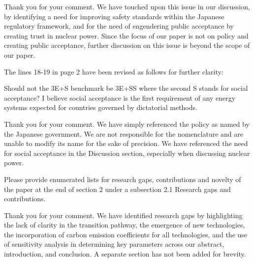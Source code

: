\documentclass[answers,11pt]{exam}
\begin{document}
\begin{questions}
        \begin{solution}
        
                 Thank you for your comment. We have touched upon this issue in our discussion, by identifying a need for improving safety standards within the Japanese regulatory framework, and for the need of engendering public acceptance by creating trust in nuclear power. Since the focus of our paper is not on policy and creating public acceptance, further discussion on this issue is beyond the scope of our paper.
                 
                 The lines 18-19 in page 2 have been revised as follows for further clarity:
                 
                 
        \end{solution}


  
                        \question  Should not the 3E+S benchmark be 3E+SS where the second S stands for social acceptance? I believe social acceptance is the first requirement of any energy systems expected for countries governed by dictatorial methods.
        
        \begin{solution}
        
                 Thank you for your comment. We have simply referenced the policy as named by the Japanese government. We are not responsible for the nomenclature and are unable to modify its name for the sake of precision. We have referenced the need for social acceptance in the Discussion section, especially when discussing nuclear power.
                 
                 
        \end{solution}      
        
        
                        \question   Please provide enumerated lists for research gaps, contributions and novelty of the paper at the end of section 2 under a subsection 2.1 Research gaps and contributions.
                                
        \begin{solution}
        
                 Thank you for your comment. We have identified research gaps by highlighting the lack of clarity in the transition pathway, the emergence of new technologies, the incorporation of carbon emission coefficients for all technologies, and the use of sensitivity analysis in determining key parameters across our abstract, introduction, and conclusion. A separate section has not been added for brevity.
                 

\end{solution}
\end{questions}
\end{document}

